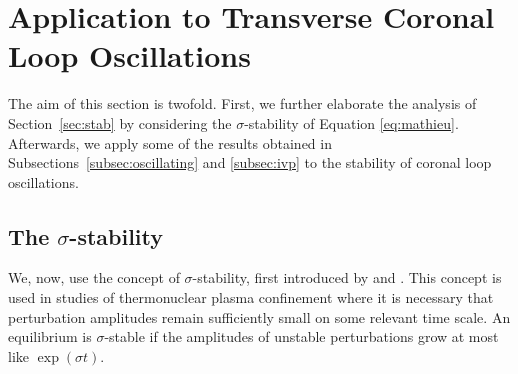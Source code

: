 \documentclass[12pt]{ociamthesis}
\begin{document}
\section{Application to Transverse Coronal Loop Oscillations}
\label{sec:loop}

The aim of this section is twofold.
First, we further elaborate the analysis of Section~\ref{sec:stab} by considering the $\sigma$-stability of Equation \eqref{eq:mathieu}.
Afterwards, we apply some of the results obtained in Subsections~\ref{subsec:oscillating} and \ref{subsec:ivp} to the stability of coronal loop oscillations.

\subsection{The \texorpdfstring{$\sigma$}{TEXT}-stability}
\label{subsec:sigma}

We, now, use the concept of $\sigma$-stability, first introduced by \cite{Goedbloed1974} and \cite{Sakanaka1974}.
This concept is used in studies of thermonuclear plasma confinement where it is necessary that perturbation amplitudes remain sufficiently small on some relevant time scale.
An equilibrium is $\sigma$-stable if the amplitudes of unstable perturbations grow at most like $\exp(\sigma t)$.
\end{document}
